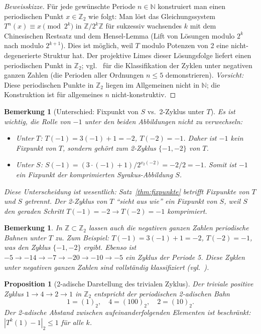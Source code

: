\documentclass[12pt,a4paper]{article}
\newtheorem{proposition}[theorem]{Proposition}
\newtheorem{remark}[theorem]{Bemerkung}
\begin{document}
\begin{proof}[Beweisskizze]
Für jede gewünschte Periode $n \in \mathbb{N}$ konstruiert man einen periodischen Punkt
$x \in \mathbb{Z}_2$ wie folgt: Man löst das Gleichungssystem $T^n(x) \equiv x \pmod{2^k}$
in $\mathbb{Z}/2^k\mathbb{Z}$ für sukzessiv wachsendes $k$ mit dem Chinesischen
Restsatz und dem Hensel-Lemma (Lift von Lösungen modulo $2^k$ nach modulo $2^{k+1}$).
Dies ist möglich, weil $T$ modulo Potenzen von 2 eine nicht-degenerierte Struktur hat.
Der projektive Limes dieser Lösungsfolge liefert einen periodischen Punkt in
$\mathbb{Z}_2$; vgl.\ \cite{Lagarias1985} für die Klassifikation der Zyklen unter
negativen ganzen Zahlen (die Perioden aller Ordnungen $n \leq 5$ demonstrieren).
\emph{Vorsicht:} Diese periodischen Punkte in $\mathbb{Z}_2$ liegen im Allgemeinen
nicht in $\mathbb{N}$; die Konstruktion ist für allgemeines $n$ nicht-konstruktiv.
\end{proof}

\begin{remark}[Unterschied: Fixpunkt von $S$ vs.\ 2-Zyklus unter $T$]\label{rem:T_vs_S}
Es ist wichtig, die Rolle von $-1$ unter den beiden Abbildungen nicht zu verwechseln:
\begin{itemize}
  \item Unter $T$: $T(-1) = 3(-1)+1 = -2$, $T(-2) = -1$. Daher ist $-1$ \emph{kein}
    Fixpunkt von $T$, sondern gehört zum 2-Zyklus $\{-1,-2\}$ von $T$.
  \item Unter $S$: $S(-1) = (3\cdot(-1)+1)/2^{v_2(-2)} = -2/2 = -1$. Somit ist $-1$
    ein \emph{Fixpunkt der komprimierten Syrakus-Abbildung $S$}.
\end{itemize}
Diese Unterscheidung ist wesentlich: Satz~\ref{thm:fixpunkte} betrifft Fixpunkte von $T$
und $S$ getrennt. Der 2-Zyklus von $T$ ``sieht aus wie'' ein Fixpunkt von $S$, weil $S$
den geraden Schritt $T(-1)=-2 \to T(-2)=-1$ komprimiert.
\end{remark}

\begin{remark}\label{rem:negativ}
In $\mathbb{Z} \subset \mathbb{Z}_2$ lassen auch die negativen ganzen Zahlen periodische
Bahnen unter $T$ zu. Zum Beispiel: $T(-1) = 3(-1)+1 = -2$, $T(-2) = -1$, was den
Zyklus $\{-1, -2\}$ ergibt. Ebenso ist $-5 \to -14 \to -7 \to -20 \to -10 \to -5$ ein
Zyklus der Periode 5. Diese Zyklen unter negativen ganzen Zahlen sind vollständig
klassifiziert (vgl.\ \cite{Lagarias1985}).
\end{remark}

\begin{proposition}[2-adische Darstellung des trivialen Zyklus]\label{prop:trivial_2adisch}
Der triviale positive Zyklus $1 \to 4 \to 2 \to 1$ in $\mathbb{Z}_2$ entspricht der
periodischen 2-adischen Bahn
\[
  1 = (1)_2, \quad 4 = (100)_2, \quad 2 = (10)_2.
\]
Der 2-adische Abstand zwischen aufeinanderfolgenden Elementen ist beschränkt:
$|T^k(1) - 1|_2 \leq 1$ für alle $k$.
\end{proposition}
\end{document}
